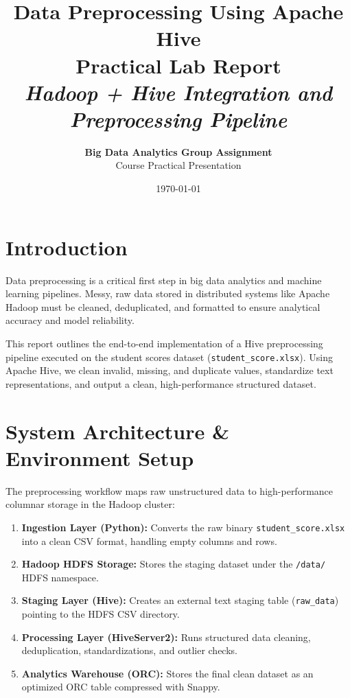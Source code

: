 \documentclass[11pt,a4paper]{article}
\title{
    \vspace{2cm}
    \Huge \textbf{Data Preprocessing Using Apache Hive \\ Practical Lab Report} \\
    \vspace{0.5cm}
    \large \textit{Hadoop + Hive Integration and Preprocessing Pipeline}
    \vspace{1.5cm}
}
\author{\textbf{Big Data Analytics Group Assignment} \\ Course Practical Presentation}
\date{\today}
\begin{document}
\maketitle
\thispagestyle{empty}
\newpage

\tableofcontents
\newpage

\section{Introduction}
Data preprocessing is a critical first step in big data analytics and machine learning pipelines. Messy, raw data stored in distributed systems like Apache Hadoop must be cleaned, deduplicated, and formatted to ensure analytical accuracy and model reliability.

This report outlines the end-to-end implementation of a Hive preprocessing pipeline executed on the student scores dataset (\texttt{student\_score.xlsx}). Using Apache Hive, we clean invalid, missing, and duplicate values, standardize text representations, and output a clean, high-performance structured dataset.

\section{System Architecture \& Environment Setup}
The preprocessing workflow maps raw unstructured data to high-performance columnar storage in the Hadoop cluster:
\begin{enumerate}
    \item \textbf{Ingestion Layer (Python):} Converts the raw binary \texttt{student\_score.xlsx} into a clean CSV format, handling empty columns and rows.
    \item \textbf{Hadoop HDFS Storage:} Stores the staging dataset under the \texttt{/data/} HDFS namespace.
    \item \textbf{Staging Layer (Hive):} Creates an external text staging table (\texttt{raw\_data}) pointing to the HDFS CSV directory.
    \item \textbf{Processing Layer (HiveServer2):} Runs structured data cleaning, deduplication, standardizations, and outlier checks.
    \item \textbf{Analytics Warehouse (ORC):} Stores the final clean dataset as an optimized ORC table compressed with Snappy.
\end{enumerate}
\end{document}
